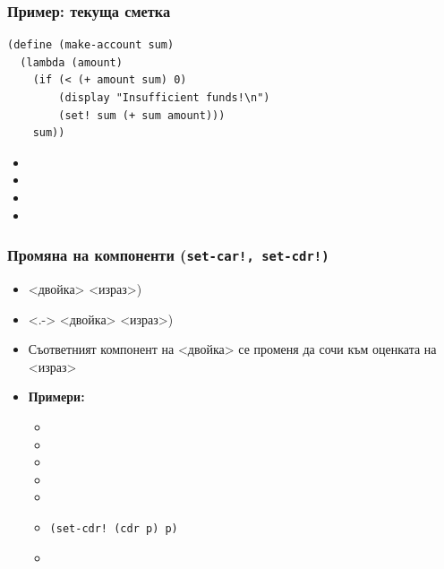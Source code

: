 \documentclass[alsotrans,beameroptions={aspectratio=169}]{beamerswitch}
\begin{document}
\begin{frame}[fragile]
  \frametitle{Пример: текуща сметка}

\begin{lstlisting}
(define (make-account sum)
  (lambda (amount)
    (if (< (+ amount sum) 0)
        (display "Insufficient funds!\n")
        (set! sum (+ sum amount)))
    sum))
\end{lstlisting}
  \onslide<+->
  \begin{itemize}[<+->]
  \item {}
  \item {}
  \item {}
  \item {}
  \end{itemize}
\end{frame}

\begin{frame}
  \frametitle{Промяна на компоненти (\tt{set-car!}, \tt{set-cdr!})}

  \begin{itemize}[<+->]
  \item {} <двойка> <израз>\tta)
  \item<.->  <двойка> <израз>\tta)
  \item Съответният компонент на <двойка> се променя да сочи към оценката на <израз>
  \item \textbf{Примери:}
    \begin{itemize}
    \item {}
    \item {}
    \item {}
    \item {}
    \item {}
    \item \tt{(set-cdr! (cdr p) p)}
    \item {}
    \end{itemize}
  \end{itemize}
\end{frame}
\end{document}
